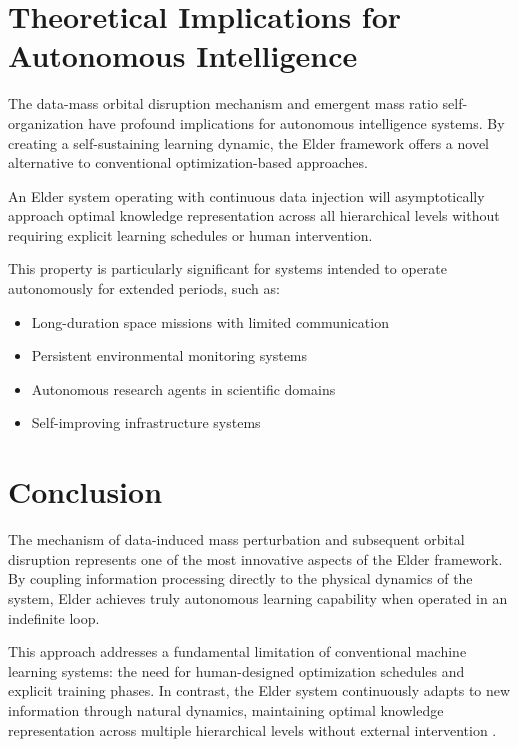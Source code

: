 \section{Theoretical Implications for Autonomous Intelligence}

The data-mass orbital disruption mechanism and emergent mass ratio self-organization have profound implications for autonomous intelligence systems. By creating a self-sustaining learning dynamic, the Elder framework offers a novel alternative to conventional optimization-based approaches.

\begin{theorem}
An Elder system operating with continuous data injection will asymptotically approach optimal knowledge representation across all hierarchical levels without requiring explicit learning schedules or human intervention.
\end{theorem}

This property is particularly significant for systems intended to operate autonomously for extended periods, such as:

\begin{itemize}
    \item Long-duration space missions with limited communication
    \item Persistent environmental monitoring systems
    \item Autonomous research agents in scientific domains
    \item Self-improving infrastructure systems
\end{itemize}

\section{Conclusion}

The mechanism of data-induced mass perturbation and subsequent orbital disruption represents one of the most innovative aspects of the Elder framework. By coupling information processing directly to the physical dynamics of the system, Elder achieves truly autonomous learning capability when operated in an indefinite loop.

This approach addresses a fundamental limitation of conventional machine learning systems: the need for human-designed optimization schedules and explicit training phases. In contrast, the Elder system continuously adapts to new information through natural dynamics, maintaining optimal knowledge representation across multiple hierarchical levels without external intervention \cite{autonomous_learning_systems}.

